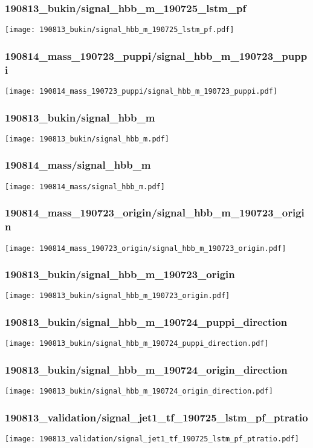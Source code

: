 \begin{frame}
   \frametitle{\small 190813\_bukin/signal\_hbb\_m\_190725\_lstm\_pf}
   \centering
   \texttt{[image: 190813\_bukin/signal\_hbb\_m\_190725\_lstm\_pf.pdf]}
\end{frame}

\begin{frame}
   \frametitle{\small 190814\_mass\_190723\_puppi/signal\_hbb\_m\_190723\_puppi}
   \centering
   \texttt{[image: 190814\_mass\_190723\_puppi/signal\_hbb\_m\_190723\_puppi.pdf]}
\end{frame}

\begin{frame}
   \frametitle{\small 190813\_bukin/signal\_hbb\_m}
   \centering
   \texttt{[image: 190813\_bukin/signal\_hbb\_m.pdf]}
\end{frame}

\begin{frame}
   \frametitle{\small 190814\_mass/signal\_hbb\_m}
   \centering
   \texttt{[image: 190814\_mass/signal\_hbb\_m.pdf]}
\end{frame}

\begin{frame}
   \frametitle{\small 190814\_mass\_190723\_origin/signal\_hbb\_m\_190723\_origin}
   \centering
   \texttt{[image: 190814\_mass\_190723\_origin/signal\_hbb\_m\_190723\_origin.pdf]}
\end{frame}

\begin{frame}
   \frametitle{\small 190813\_bukin/signal\_hbb\_m\_190723\_origin}
   \centering
   \texttt{[image: 190813\_bukin/signal\_hbb\_m\_190723\_origin.pdf]}
\end{frame}

\begin{frame}
   \frametitle{\small 190813\_bukin/signal\_hbb\_m\_190724\_puppi\_direction}
   \centering
   \texttt{[image: 190813\_bukin/signal\_hbb\_m\_190724\_puppi\_direction.pdf]}
\end{frame}

\begin{frame}
   \frametitle{\small 190813\_bukin/signal\_hbb\_m\_190724\_origin\_direction}
   \centering
   \texttt{[image: 190813\_bukin/signal\_hbb\_m\_190724\_origin\_direction.pdf]}
\end{frame}

\begin{frame}
   \frametitle{\small 190813\_validation/signal\_jet1\_tf\_190725\_lstm\_pf\_ptratio}
   \centering
   \texttt{[image: 190813\_validation/signal\_jet1\_tf\_190725\_lstm\_pf\_ptratio.pdf]}
\end{frame}

